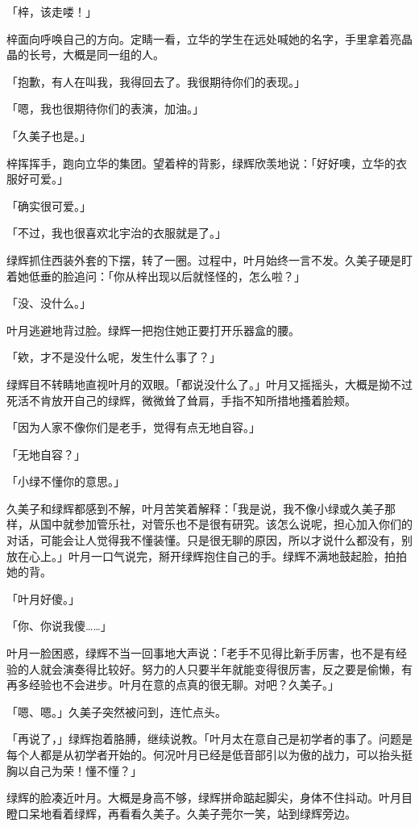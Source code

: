 \documentclass[UTF8]{ctexart}
\begin{document}
    「梓，该走喽！」 

    梓面向呼唤自己的方向。定睛一看，立华的学生在远处喊她的名字，手里拿着亮晶晶的长号，大概是同一组的人。 

    「抱歉，有人在叫我，我得回去了。我很期待你们的表现。」 

    「嗯，我也很期待你们的表演，加油。」 

    「久美子也是。」 

    梓挥挥手，跑向立华的集团。望着梓的背影，绿辉欣羡地说：「好好噢，立华的衣服好可爱。」 

    「确实很可爱。」 

    「不过，我也很喜欢北宇治的衣服就是了。」 

    绿辉抓住西装外套的下摆，转了一圈。过程中，叶月始终一言不发。久美子硬是盯着她低垂的脸追问：「你从梓出现以后就怪怪的，怎么啦？」 

    「没、没什么。」 

    叶月逃避地背过脸。绿辉一把抱住她正要打开乐器盒的腰。 

    「欸，才不是没什么呢，发生什么事了？」 

    绿辉目不转睛地直视叶月的双眼。「都说没什么了。」叶月又摇摇头，大概是拗不过死活不肯放开自己的绿辉，微微耸了耸肩，手指不知所措地搔着脸颊。 

    「因为人家不像你们是老手，觉得有点无地自容。」 

    「无地自容？」 

    「小绿不懂你的意思。」 

    久美子和绿辉都感到不解，叶月苦笑着解释：「我是说，我不像小绿或久美子那样，从国中就参加管乐社，对管乐也不是很有研究。该怎么说呢，担心加入你们的对话，可能会让人觉得我不懂装懂。只是很无聊的原因，所以才说什么都没有，别放在心上。」叶月一口气说完，掰开绿辉抱住自己的手。绿辉不满地鼓起脸，拍拍她的背。 

    「叶月好傻。」 

    「你、你说我傻……」 

    叶月一脸困惑，绿辉不当一回事地大声说：「老手不见得比新手厉害，也不是有经验的人就会演奏得比较好。努力的人只要半年就能变得很厉害，反之要是偷懒，有再多经验也不会进步。叶月在意的点真的很无聊。对吧？久美子。」 

    「嗯、嗯。」久美子突然被问到，连忙点头。 

    「再说了，」绿辉抱着胳膊，继续说教。「叶月太在意自己是初学者的事了。问题是每个人都是从初学者开始的。何况叶月已经是低音部引以为傲的战力，可以抬头挺胸以自己为荣！懂不懂？」 

    绿辉的脸凑近叶月。大概是身高不够，绿辉拼命踮起脚尖，身体不住抖动。叶月目瞪口呆地看着绿辉，再看看久美子。久美子莞尔一笑，站到绿辉旁边。 
\end{document}
